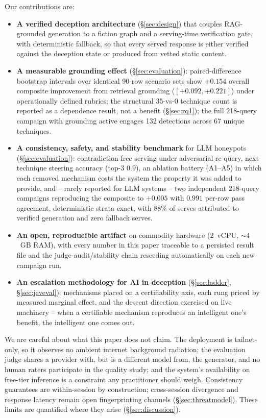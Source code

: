 \noindent Our contributions are:
\begin{itemize}
\item \textbf{A verified deception architecture} (\S\ref{sec:design}) that
couples RAG-grounded generation to a fiction graph and a serving-time
verification gate, with deterministic fallback, so that every served
response is either verified against the deception state or produced from
vetted static content.
\item \textbf{A measurable grounding effect} (\S\ref{sec:evaluation}):
paired-difference bootstrap intervals over identical 90-row scenario
sets show $+0.154$ overall composite improvement from retrieval
grounding ($[+0.092, +0.221]$) under operationally defined rubrics; the
structural 35-vs-0 technique count is reported as a dependence result,
not a benefit (\S\ref{sec:rq1}); the full 218-query campaign with
grounding active engages 132 detections across 67 unique techniques.
\item \textbf{A consistency, safety, and stability benchmark} for LLM
honeypots (\S\ref{sec:evaluation}): contradiction-free serving under
adversarial re-query, next-technique steering accuracy (top-3 $0.9$), an
ablation battery (A1--A5) in which each removed mechanism costs the
system the property it was added to provide, and -- rarely reported for
LLM systems -- two independent 218-query campaigns reproducing the
composite to $+0.005$ with $0.991$ per-row pass agreement, deterministic
strata exact, with 88\% of serves attributed to verified generation and
zero fallback serves.
\item \textbf{An open, reproducible artifact} on commodity hardware
(2~vCPU, ${\sim}4$~GB RAM), with every number in this paper traceable to a
persisted result file and the judge-audit/stability chain reseeding
automatically on each new campaign run.
\item \textbf{An escalation methodology for AI in deception}
(\S\ref{sec:ladder}, \S\ref{sec:jeveval}): mechanisms placed on a
certifiability axis, each rung priced by measured marginal effect, and
the descent direction exercised on live machinery -- when a certifiable
mechanism reproduces an intelligent one's benefit, the intelligent one
comes out.
\end{itemize}

We are careful about what this paper does not claim. The deployment is
tailnet-only, so it observes no ambient internet background radiation;
the evaluation judge shares a provider with, but is a different model from, the
generator, and no human raters participate in the quality study; and the
system's availability on free-tier inference is a
constraint any practitioner should weigh. Consistency guarantees are
within-session by construction; cross-session divergence and response
latency remain open fingerprinting channels (\S\ref{sec:threatmodel}).
These limits are quantified
where they arise (\S\ref{sec:discussion}).

